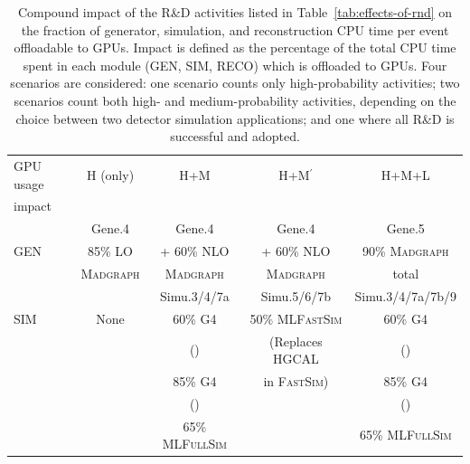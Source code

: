 \begin{table}[htbp]
\small
	\centering
	\caption{Compound impact of the R\&D activities listed in Table~\ref{tab:effects-of-rnd} on the fraction of generator, simulation, and reconstruction \gls{CPU} time per event offloadable to \glspl{GPU}. Impact is defined as the percentage of the total \gls{CPU} time spent in each module (\gls{GEN}, \gls{SIM}, \gls{RECO}) which is offloaded to \glspl{GPU}. Four scenarios are considered: one scenario counts only high-probability activities; two scenarios count both high- and medium-probability activities, depending on the choice between two detector simulation applications; and one where all R\&D is successful and adopted.}
	\begin{tabular}{|l|c|c|c|c|}
	\hline
	\rowcolor{tableheader}  \gls{GPU} usage   & H (only)        &  H+M                  & H+M$^{\prime}$        & H+M+L    \\
	\rowcolor{tableheader}  impact            &                 &                       &                       &     \\ \hline
	\cellcolor{tablerowheader}                &  Gene.4         &  Gene.4               &  Gene.4               & Gene.5   \\ 
	\cellcolor{tablerowheader} GEN      &   85\% LO &  + 60\% NLO     & + 60\% NLO      & 90\% \textsc{Madgraph} \\ 
	\cellcolor{tablerowheader}                &  \textsc{Madgraph}       & \textsc{Madgraph}              & \textsc{Madgraph}              &  total \\ \hline
	\cellcolor{tablerowheader}                &                 &  Simu.3/4/7a          &  Simu.5/6/7b          & Simu.3/4/7a/7b/9   \\ 
	\cellcolor{tablerowheader} SIM      &   None          &  60\% G4              &  50\% \textsc{MLFastSim}       & 60\% G4  \\
	\cellcolor{tablerowheader}                &                 & (\RunFour)            & (Replaces HGCAL & (\RunFour)   \\
	\cellcolor{tablerowheader}                &                 & 85\% G4               & in \textsc{FastSim})           & 85\% G4  \\  
	\cellcolor{tablerowheader}                &                 & (\RunFive)            &                       & (\RunFive)   \\
	\cellcolor{tablerowheader}                &                 & 65\% \textsc{MLFullSim}        &                       & 65\% \textsc{MLFullSim}  \\  

\end{tabular}
\end{table}
